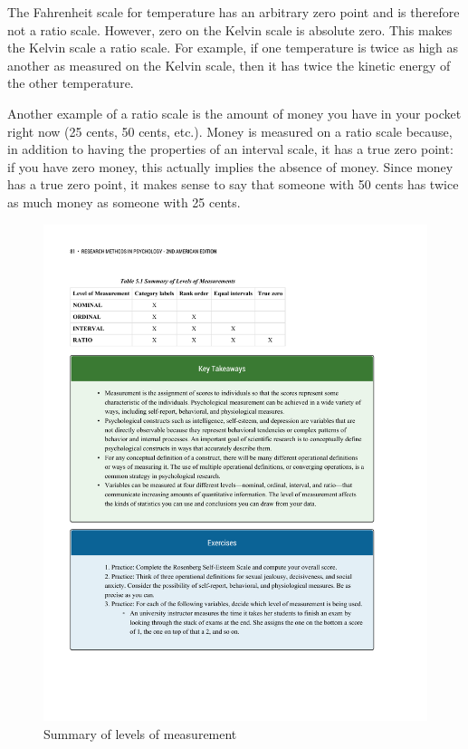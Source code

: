 \documentclass[]{book}
\theoremstyle{definition}
\theoremstyle{definition}
\theoremstyle{remark}
\begin{document}
The Fahrenheit scale for temperature has an arbitrary zero point and is
therefore not a ratio scale. However, zero on the Kelvin scale is
absolute zero. This makes the Kelvin scale a ratio scale. For example,
if one temperature is twice as high as another as measured on the Kelvin
scale, then it has twice the kinetic energy of the other temperature.

Another example of a ratio scale is the amount of money you have in your
pocket right now (25 cents, 50 cents, etc.). Money is measured on a
ratio scale because, in addition to having the properties of an interval
scale, it has a true zero point: if you have zero money, this actually
implies the absence of money. Since money has a true zero point, it
makes sense to say that someone with 50 cents has twice as much money as
someone with 25 cents.

\begin{figure}[htbp]
\centering
\includegraphics{figures/C5Mscales.pdf}
\caption{Summary of levels of measurement}
\end{figure}
\end{document}
